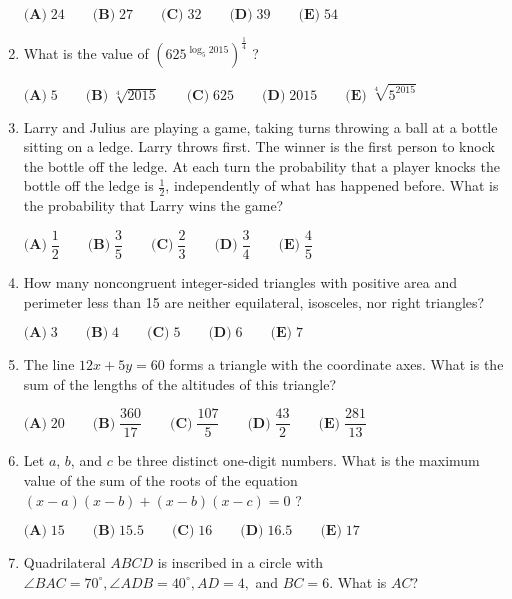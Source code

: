 \documentclass{article}
\begin{document}
\begin{enumerate}[label=\arabic*., itemsep=0.5em]
$\textbf{(A)}\; 24 \qquad\textbf{(B)}\; 27 \qquad\textbf{(C)}\; 32 \qquad\textbf{(D)}\; 39 \qquad\textbf{(E)}\; 54$\par \vspace{0.5em}\item What is the value of $(625^{\log_5 2015})^{\frac{1}{4}}$ ?

$\textbf{(A)}\; 5 \qquad\textbf{(B)}\; \sqrt[4]{2015} \qquad\textbf{(C)}\; 625 \qquad\textbf{(D)}\; 2015 \qquad\textbf{(E)}\; \sqrt[4]{5^{2015}}$\par \vspace{0.5em}\item Larry and Julius are playing a game, taking turns throwing a ball at a bottle sitting on a ledge. Larry throws first. The winner is the first person to knock the bottle off the ledge. At each turn the probability that a player knocks the bottle off the ledge is $\tfrac{1}{2}$, independently of what has happened before. What is the probability that Larry wins the game?

$\textbf{(A)}\; \dfrac{1}{2} \qquad\textbf{(B)}\; \dfrac{3}{5} \qquad\textbf{(C)}\; \dfrac{2}{3} \qquad\textbf{(D)}\; \dfrac{3}{4} \qquad\textbf{(E)}\; \dfrac{4}{5}$\par \vspace{0.5em}\item How many noncongruent integer-sided triangles with positive area and perimeter less than 15 are neither equilateral, isosceles, nor right triangles?

$\textbf{(A)}\; 3 \qquad\textbf{(B)}\; 4 \qquad\textbf{(C)}\; 5 \qquad\textbf{(D)}\; 6 \qquad\textbf{(E)}\; 7$\par \vspace{0.5em}\item The line $12x+5y=60$ forms a triangle with the coordinate axes. What is the sum of the lengths of the altitudes of this triangle?

$\textbf{(A)}\; 20 \qquad\textbf{(B)}\; \dfrac{360}{17} \qquad\textbf{(C)}\; \dfrac{107}{5} \qquad\textbf{(D)}\; \dfrac{43}{2} \qquad\textbf{(E)}\; \dfrac{281}{13}$\par \vspace{0.5em}\item Let $a$, $b$, and $c$ be three distinct one-digit numbers. What is the maximum value of the sum of the roots of the equation $(x-a)(x-b)+(x-b)(x-c)=0$ ?

$\textbf{(A)}\; 15 \qquad\textbf{(B)}\; 15.5 \qquad\textbf{(C)}\; 16 \qquad\textbf{(D)}\; 16.5 \qquad\textbf{(E)}\; 17$\par \vspace{0.5em}\item Quadrilateral $ABCD$ is inscribed in a circle with $\angle BAC=70^{\circ}, \angle ADB=40^{\circ}, AD=4,$ and $BC=6$. What is $AC$?


\end{enumerate}
\end{document}
